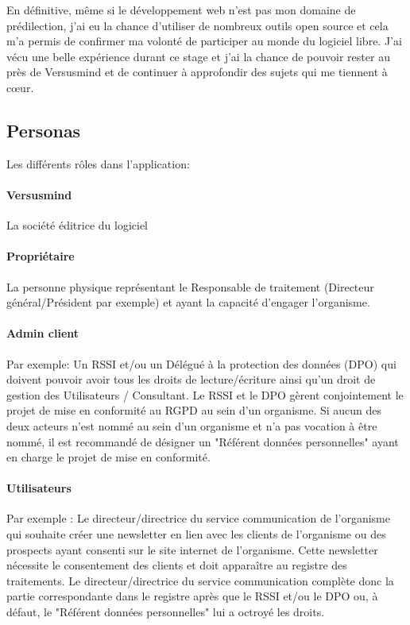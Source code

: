 \documentclass[12pt, a4paper]{report}
\begin{document}
En définitive, même si le développement web n'est pas mon domaine de prédilection, j'ai eu la chance d'utiliser de nombreux outils open source et cela m'a permis de confirmer ma volonté de participer au monde du logiciel libre.
J'ai vécu une belle expérience durant ce stage et j'ai la chance de pouvoir rester au près de Versusmind et de continuer à approfondir des sujets qui me tiennent à cœur.

\begin{appendix}
\chapter{Personas}
\label{appendix:personas}
Les différents rôles dans l'application:

\subsubsection{Versusmind}
La société éditrice du logiciel

\subsubsection{Propriétaire}

La personne physique représentant le Responsable de traitement (Directeur général/Président par exemple) et ayant la capacité d'engager l'organisme.

\subsubsection{Admin client}
Par exemple: Un RSSI et/ou un Délégué à la protection des données (DPO) qui doivent pouvoir avoir tous les droits de lecture/écriture ainsi qu'un droit de gestion des Utilisateurs / Consultant.\newline
Le RSSI et le DPO gèrent conjointement le projet de mise en conformité au RGPD au sein d'un organisme.\newline
Si aucun des deux acteurs n'est nommé au sein d'un organisme et n'a pas vocation à être nommé, il est recommandé de désigner un "Référent données personnelles" ayant en charge le projet de mise en conformité.\newpage

\subsubsection{Utilisateurs}
Par exemple : Le directeur/directrice du service communication de l'organisme qui souhaite créer une newsletter en lien avec les clients de l'organisme ou des prospects ayant consenti sur le site internet de l'organisme.\newline
Cette newsletter nécessite le consentement des clients et doit apparaître au registre des traitements.\newline
Le directeur/directrice du service communication complète donc la partie correspondante dans le registre après que le RSSI et/ou le DPO ou, à défaut, le "Référent données personnelles" lui a octroyé les droits.


\end{appendix}
\end{document}
